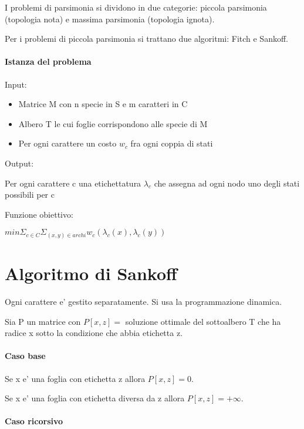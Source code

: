 I problemi di parsimonia si dividono in due categorie: piccola parsimonia (topologia nota) e massima parsimonia (topologia ignota).

Per i problemi di piccola parsimonia si trattano due algoritmi: Fitch e Sankoff.

\paragraph{Istanza del problema}

Input:

\begin{itemize}
    \item Matrice M con n specie in S e m caratteri in C
    \item Albero T le cui foglie corrispondono alle specie di M
    \item Per ogni carattere un costo $w_c$ fra ogni coppia di stati
\end{itemize}

Output:

Per ogni carattere c una etichettatura $\lambda_c $ che assegna ad ogni nodo uno degli stati possibili per c

Funzione obiettivo:

$min \Sigma _ {c \in C} \Sigma _ {(x,y) \in archi} w_c(\lambda_c(x), \lambda_c(y))$

\section{Algoritmo di Sankoff}

Ogni carattere e' gestito separatamente. Si usa la programmazione dinamica.

Sia P un matrice con $P[x,z] = $ soluzione ottimale del sottoalbero T che ha radice x sotto la condizione che abbia etichetta z.

\paragraph{Caso base}

Se x e' una foglia con etichetta z allora $P[x,z] = 0$.

Se x e' una foglia con etichetta diversa da z allora $P[x,z] = +\infty$.

\paragraph{Caso ricorsivo}

